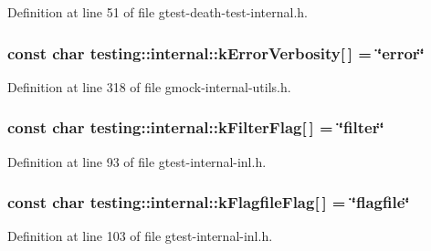 Definition at line 51 of file gtest-\/death-\/test-\/internal.\+h.

\subsubsection[{\texorpdfstring{k\+Error\+Verbosity}{kErrorVerbosity}}]{\setlength{\rightskip}{0pt plus 5cm}const char testing\+::internal\+::k\+Error\+Verbosity\mbox{[}$\,$\mbox{]} = \char`\"{}error\char`\"{}}\hypertarget{namespacetesting_1_1internal_a3d730761274e7b80dd66e5014171fcb5}{}\label{namespacetesting_1_1internal_a3d730761274e7b80dd66e5014171fcb5}


Definition at line 318 of file gmock-\/internal-\/utils.\+h.

\subsubsection[{\texorpdfstring{k\+Filter\+Flag}{kFilterFlag}}]{\setlength{\rightskip}{0pt plus 5cm}const char testing\+::internal\+::k\+Filter\+Flag\mbox{[}$\,$\mbox{]} = \char`\"{}filter\char`\"{}}\hypertarget{namespacetesting_1_1internal_a8cb8ee7fe7659e6916a0108dffa2f7dc}{}\label{namespacetesting_1_1internal_a8cb8ee7fe7659e6916a0108dffa2f7dc}


Definition at line 93 of file gtest-\/internal-\/inl.\+h.

\subsubsection[{\texorpdfstring{k\+Flagfile\+Flag}{kFlagfileFlag}}]{\setlength{\rightskip}{0pt plus 5cm}const char testing\+::internal\+::k\+Flagfile\+Flag\mbox{[}$\,$\mbox{]} = \char`\"{}flagfile\char`\"{}}\hypertarget{namespacetesting_1_1internal_aa1ffe15dea227d4dded912e43a8eed84}{}\label{namespacetesting_1_1internal_aa1ffe15dea227d4dded912e43a8eed84}


Definition at line 103 of file gtest-\/internal-\/inl.\+h.

